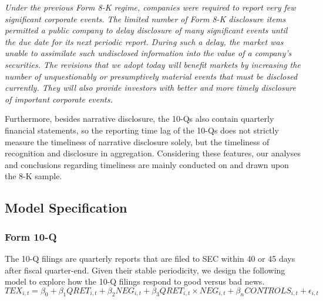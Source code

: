 \documentclass[letterpaper,11pt]{article}
\begin{document}
\begin{spacing}{1.5}
\begin{adjustwidth}{1cm}{1cm}
\begin{singlespace}
	\indent \textit{Under the previous Form 8-K regime, companies were required to report very few significant corporate events. The limited number of Form 8-K disclosure items permitted a public company to delay disclosure of many significant events until the due date for its next periodic report. During such a delay, the market was unable to assimilate such undisclosed information into the value of a company's securities. The revisions that we adopt today will benefit markets by increasing the number of unquestionably or presumptively material events that must be disclosed currently. They will also provide investors with better and more timely disclosure of important corporate events.}
\end{singlespace}
\end{adjustwidth}
	
Furthermore, besides narrative disclosure, the 10-Qs also contain quarterly financial statements, so the reporting time lag of the 10-Qs does not strictly measure the timeliness of narrative disclosure solely, but the timeliness of recognition and disclosure in aggregation. Considering these features, our analyses and conclusions regarding timeliness are mainly conducted on and drawn upon the 8-K sample.

\subsection{Model Specification} \label{sec3.3}
\subsubsection{Form 10-Q}
The 10-Q filings are quarterly reports that are filed to SEC within 40 or 45 days after fiscal quarter-end. Given their stable periodicity, we design the following model to explore how the 10-Q filings respond to good versus bad news. 
\begin{equation} \label{eq1}
TEX_{i,t}=\beta_0+\beta_1QRET_{i,t}+\beta_2NEG_{i,t}+\beta_3QRET_{i,t}\times NEG_{i,t}+\beta_nCONTROLS_{i,t}+\epsilon_{i,t}
\end{equation}


\end{spacing}
\end{document}
